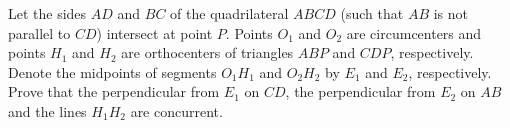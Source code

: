 Let the sides $AD$ and $BC$ of the quadrilateral $ABCD$ (such that $AB$ is not parallel to $CD$) intersect at point $P$. Points $O_1$ and $O_2$ are circumcenters and points $H_1$ and $H_2$ are orthocenters of triangles $ABP$ and $CDP$, respectively. Denote the midpoints of segments $O_1H_1$ and $O_2H_2$ by $E_1$ and $E_2$, respectively. Prove that the perpendicular from $E_1$ on $CD$, the perpendicular from $E_2$ on $AB$ and the lines $H_1H_2$ are concurrent.
